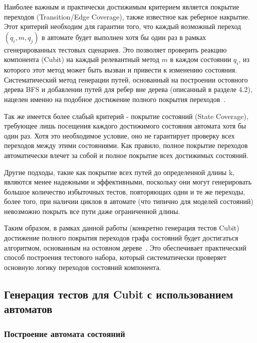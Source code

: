 \documentclass[14pt, russian]{scrartcl}
\begin{document}
Наиболее важным и практически достижимым критерием является покрытие переходов (Transition/Edge Coverage), также известное как реберное накрытие. Этот критерий необходим для гарантии того, что каждый возможный переход $(q_i, m, q_j)$ в автомате будет выполнен хотя бы один раз в рамках сгенерированных тестовых сценариев. Это позволяет проверить реакцию компонента (Cubit) на каждый релевантный метод $m$ в каждом состоянии $q_i$, из которого этот метод может быть вызван и привести к изменению состояния. Систематический метод генерации путей, основанный на построении остовного дерева BFS и добавлении путей для ребер вне дерева (описанный в разделе 4.2), нацелен именно на подобное достижение полного покрытия переходов~\cite{Karhumaki1992}.

Так же имеется более слабый критерий - покрытие состояний (State Coverage), требующее лишь посещения каждого достижимого состояния автомата хотя бы один раз. Хотя это необходимое условие, оно не гарантирует проверку всех переходов между этими состояниями. Как правило, полное покрытие переходов автоматически влечет за собой и полное покрытие всех достижимых состояний.

Другие подходы, такие как покрытие всех путей до определенной длины k, являются менее надежными и эффективными, поскольку они могут генерировать большое количество избыточных тестов, повторяющих одни и те же переходы, более того, при наличии циклов в автомате (что типично для моделей состояний) невозможно покрыть все пути даже ограниченной длины.

Таким образом, в рамках данной работы (конкретно генерация тестов Cubit) достижение полного покрытия переходов графа состояний будет достигаться алгоритмом, основанным на остовном дереве~\cite{Lothaire1983}. Это обеспечивает практический способ построения тестового набора, который систематически проверяет основную логику переходов состояний компонента.


\subsection{Генерация тестов для Cubit с использованием автоматов}


\subsubsection{Построение автомата состояний}
\end{document}

